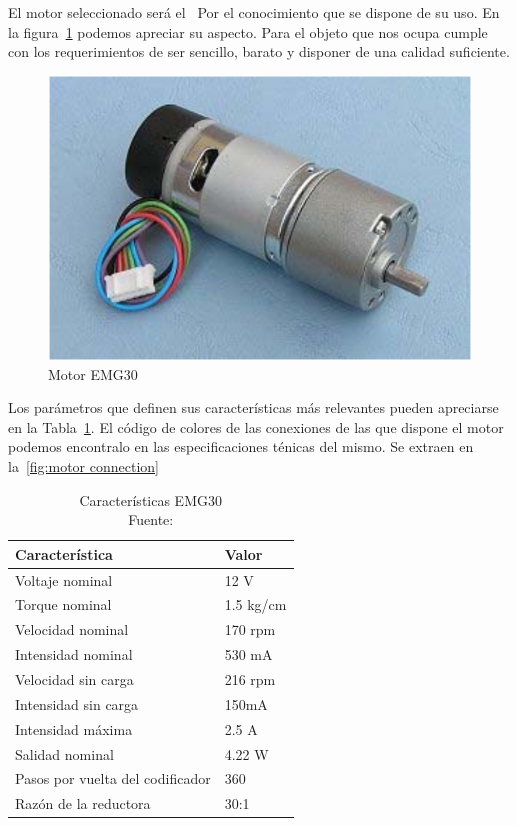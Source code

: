 
El motor seleccionado será el~\cite{EMG30datasheet} Por el conocimiento que se dispone de su uso. En la figura~\cref{fig:EMG Motor} podemos apreciar su aspecto. Para el objeto que nos ocupa cumple con los requerimientos de ser sencillo, barato y disponer de una calidad suficiente.

\begin{figure}[H]
    \centering
    \includegraphics[scale = 0.4]{part/Proyecto_ejecutivo/memoria_constructiva/motor/img/MotorEMG30}
    \caption{Motor EMG30\cite{EMG30datasheet}}\label{fig:EMG Motor}
\end{figure}

Los parámetros que definen sus características más relevantes pueden apreciarse en la Tabla~\ref{tab:EMG30specifications}. El código de colores de las conexiones de las que dispone el motor podemos encontralo en las especificaciones ténicas del mismo. Se extraen en la~\cref{fig:motor connection}


\begin{table}[H]
    \centering
    \begin{tabular}{|l|l|}
        \hline
        Característica & Valor\\
        \hline
        Voltaje nominal & 12 V\\
        \hline
        Torque nominal & 1.5 kg/cm\\
        \hline
        Velocidad nominal & 170 rpm\\
        \hline
        Intensidad nominal & 530 mA\\
        \hline
        Velocidad sin carga& 216 rpm\\
        \hline
        Intensidad sin carga& 150mA\\
        \hline
        Intensidad máxima& 2.5 A\\
        \hline
        Salidad nominal & 4.22 W\\
        \hline
        Pasos por vuelta del codificador& 360 \\
        \hline
        Razón de la reductora & 30:1\\
        \hline
    \end{tabular}
    \caption{Características EMG30 \\ Fuente:\cite{EMG30datasheet}}\label{tab:EMG30specifications}
\end{table}


